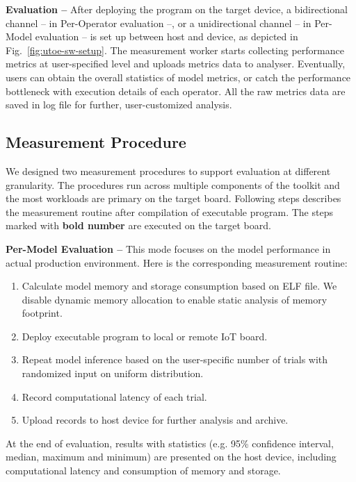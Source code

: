 {\bf Evaluation --} After deploying the program on the target device, a bidirectional channel -- in Per-Operator evaluation --, or a unidirectional channel -- in Per-Model evaluation -- is set up between host and device, as depicted in Fig.~\ref{fig:utoe-sw-setup}. The measurement worker starts collecting performance metrics at user-specified level and uploads metrics data to analyser. Eventually, users can obtain the overall statistics of model metrics, or catch the performance bottleneck with execution details of each operator. All the raw metrics data are saved in log file for further, user-customized analysis.

\subsection{Measurement Procedure}
We designed two measurement procedures to support evaluation at different granularity. The procedures run across multiple components of the toolkit and the most workloads are primary on the target board. Following steps describes the measurement routine after compilation of executable program. The steps marked with \textbf{bold number} are executed on the target board.

\newcommand{\itembf}{\item[\stepcounter{enumi}\textbf{\arabic{enumi})}]}
{\bf Per-Model Evaluation --}
This mode focuses on the model performance in actual production environment. Here is the corresponding measurement routine:
\begin{enumerate}[]
    \item Calculate model memory and storage consumption based on ELF file. We disable dynamic memory allocation to enable static analysis of memory footprint.
    \item Deploy executable program to local or remote IoT board.
    \itembf Repeat model inference based on the user-specific number of trials with randomized input on uniform distribution.
    \itembf Record computational latency of each trial.
    \itembf Upload records to host device for further analysis and archive.
\end{enumerate}

At the end of evaluation, results with statistics (e.g. 95\% confidence interval, median, maximum and minimum) are presented on the host device, including computational latency and consumption of memory and storage.

